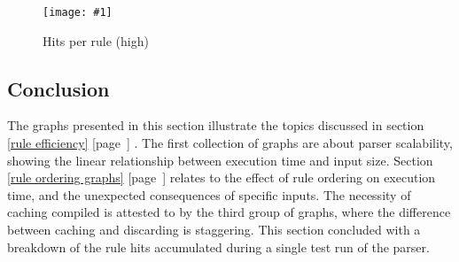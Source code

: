 \documentclass[a4paper,12pt,draft]{article}
\newcommand{\showgraph}[3]{
    \begin{figure}[hbt!]
        \caption{#2}\label{#3}
        \texttt{[image: \#1]}
    \end{figure}
}
\newcommand{\refwithpage}[1]{%
    \empty{}\ref{#1} [page~\pageref{#1}]%
}
\begin{document}
\showgraph{build/plot-hits-high}{Hits per rule (high)}{hits per rule
high}

\clearpage

\subsection{Conclusion}

The graphs presented in this section illustrate the topics discussed in
section~\refwithpage{rule efficiency}.  The first collection of graphs are
about parser scalability, showing the linear relationship between execution
time and input size.  Section~\refwithpage{rule ordering graphs} relates to
the effect of rule ordering on execution time, and the unexpected
consequences of specific inputs.  The necessity of caching compiled
\regexes{} is attested to by the third group of graphs, where the
difference between caching and discarding is staggering.  This section
concluded with a breakdown of the rule hits accumulated during a single
test run of the parser.


\renewcommand{\glossarytitle}{\section{Glossary}\label{Glossary}}
\printglossary{}
\renewcommand{\glossarytitle}{\section{Acronyms}\label{Acronyms}}
\printacronym{}

\end{document}
